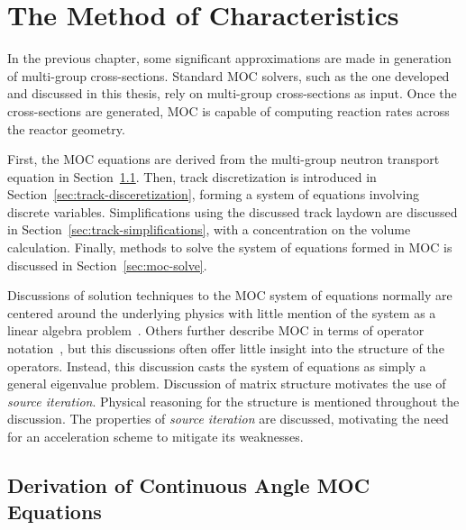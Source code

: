 \chapter{The Method of Characteristics}
\label{chap:moc}

In the previous chapter, some significant approximations are made in generation of multi-group cross-sections. Standard \ac{MOC} solvers, such as the one developed and discussed in this thesis, rely on multi-group cross-sections as input. Once the cross-sections are generated, \ac{MOC} is capable of computing reaction rates across the reactor geometry.

First, the \ac{MOC} equations are derived from the multi-group neutron transport equation in Section~\ref{sec:derivation-of-moc}. Then, track discretization is introduced in Section~\ref{sec:track-disceretization}, forming a system of equations involving discrete variables. Simplifications using the discussed track laydown are discussed in Section~\ref{sec:track-simplifications}, with a concentration on the volume calculation. Finally, methods to solve the system of equations formed in \ac{MOC} is discussed in Section~\ref{sec:moc-solve}. 

Discussions of solution techniques to the \ac{MOC} system of equations normally are centered around the underlying physics with little mention of the system as a linear algebra problem~\cite{boyd2014openmoc}. Others further describe \ac{MOC} in terms of operator notation~\cite{mocfe_init, kochunas}, but this discussions often offer little insight into the structure of the operators. Instead, this discussion casts the system of equations as simply a general eigenvalue problem. Discussion of matrix structure motivates the use of \textit{source iteration}. Physical reasoning for the structure is mentioned throughout the discussion. The properties of \textit{source iteration} are discussed, motivating the need for an acceleration scheme to mitigate its weaknesses.


\section{Derivation of Continuous Angle MOC Equations}
\label{sec:derivation-of-moc}


